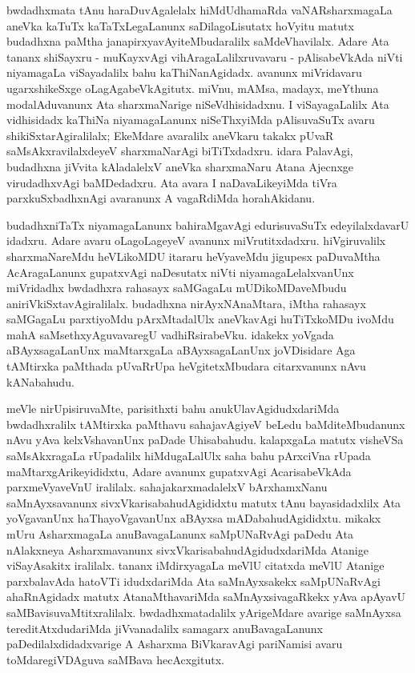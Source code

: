 bwdadhxmata tAnu haraDuvAgalelalx hiMdUdhamaRda vaNARsharxmagaLa aneVka kaTuTx kaTaTxLegaLanunx saDilagoLisutatx hoVyitu matutx budadhxna paMtha janapirxyavAyi\-teMbuda\-ralilx saMdeVhavilalx. Adare Ata tananx shiSayxru - muKayxvAgi vihAragaLalilxruvavaru - pAlisabeVkAda niVti niyamagaLa viSayadalilx bahu kaThiNanAgidadx. avanunx miVridavaru ugarxshikeSxge oLagAgabeVkAgitutx. miVnu, mAMsa, madayx, meYthuna modalAduvanunx Ata sharxmaNarige niSeVdhisidadxnu. I viSayagaLalilx Ata vidhisidadx kaThiNa niyamagaLanunx niSeThxyiMda pAlisuvaSuTx avaru shikiSxtarAgiralilalx; EkeMdare avaralilx aneVkaru takakx pUvaR saMsAkxravilalxdeyeV sharxmaNarAgi biTiTxdadxru. idara PalavAgi, budadhxna jiVvita kAladalelxV aneVka sharxmaNaru Atana Ajecnxge virudadhxvAgi baMDedadxru. Ata avara I naDavaLikeyiMda tiVra parxkuSxbadhxnAgi avaranunx A vagaRdiMda horahAkidanu.

budadhxniTaTx niyamagaLanunx bahiraMgavAgi edurisuvaSuTx edeyilalxdavarU idadxru. Adare avaru oLagoLageyeV avanunx miVrutitxdadxru. hiVgiruvalilx sharxmaNareMdu heVLikoMDU itararu heVyaveMdu jigupesx paDuvaMtha AcAragaLanunx gupatxvAgi naDesutatx niVti niyamagaLelalxvanUnx miVridadhx bwdadhxra rahasayx saMGagaLu mUDikoMDaveMbudu aniriVkiSxtavAgiralilalx. budadhxna nirAyxNAnaMtara, iMtha rahasayx saMGagaLu parxtiyoMdu pArxMtadalUlx aneVkavAgi huTiTxkoMDu ivoMdu mahA saMsethxyAguvavaregU vadhiRsirabeVku. idakekx yoVgada aBAyxsagaLanUnx maMtarxgaLa aBAyxsagaLanUnx joVDisidare Aga tAMtirxka paMthada pUvaRrUpa heVgitetxMbudara citarxvanunx nAvu kANabahudu.

meVle nirUpisiruvaMte, parisithxti bahu anukUlavAgidudxdariMda bwdadhxralilx tAMtirxka paMthavu sahajavAgiyeV beLedu baMditeMbudanunx nAvu yAva kelxVshavanUnx paDade Uhisabahudu. kalapxgaLa matutx visheVSa saMsAkxragaLa rUpadalilx hiMdugaLalUlx saha bahu pArxciVna rUpada maMtarxgArikeyididxtu, Adare avanunx gupatxvAgi Acarisa\-beVkAda parxmeVyaveVnU iralilalx. sahajakarxmadalelxV bArxhamxNanu saMnAyxsavanunx sivxVkarisa\-bahudAgididxtu matutx tAnu bayasidadxlilx Ata yoVgavanUnx haThayoVgavanUnx aBAyxsa mADabahudAgididxtu. mikakx mUru AsharxmagaLa anuBavagaLanunx saMpUNaRvAgi \hbox{paDedu} Ata nAlakxneya Asharxmavanunx sivxVkarisabahudAgidudxdariMda Atanige viSayAsakitx iralilalx. tananx iMdirxyagaLa meVlU citatxda meVlU Atanige parxbalavAda hatoVTi idudxdariMda Ata saMnAyxsakekx saMpUNaRvAgi ahaRnAgidadx matutx AtanaMthavariMda saMnAyxsivagaRkekx yAva apAyavU saMBavisuvaMtitxralilalx. bwdadhxmatadalilx yArigeMdare avarige \hbox{saMnAyxsa} tereditAtxdudariMda jiVvanadalilx samagarx anuBavagaLanunx paDedilalxdidadxvarige A Asharxma BiVkaravAgi pariNamisi avaru toMdaregiVDAguva saMBava hecAcxgitutx.

